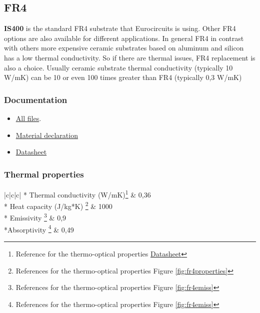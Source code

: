 \documentclass[final]{cubedoc}
\begin{document}
	\pagebreak
	
	\subsection{FR4}
	
	\textbf{IS400} is the standard FR4 substrate that Eurocircuits is using. Other FR4 options are also available for different applications. In general FR4 in contrast with others more expensive ceramic substrates based on aluminum and silicon has a low thermal conductivity. So if there are thermal issues, FR4 replacement is also a choice. Usually ceramic substrate thermal conductivity (typically 10 W/mK) can be 10 or even 100 times greater than FR4 (typically 0,3 W/mK) \cite{zotero-57, zotero-56}
	
	\subsubsection{Documentation}
	
	\begin{itemize}
		\item \href{https://www.isola-group.com/products/all-printed-circuit-materials/is400/}{All files}. 
		\item \href{https://www.isola-group.com/wp-content/uploads/IS400MaterialDeclaration2007.pdf}{Material declaration}
		\item \href{https://www.isola-group.com/wp-content/uploads/data-sheets/is400.pdf?v=1585950502}{Datasheet}
	\end{itemize}
	
	
	\subsubsection{Thermal properties}
	
	\begin{center}
		\tablehead{\hline}
		\tabletail{\hline}
		\begin{mpsupertabular}{|c|c|c|}
			 {*} {Thermal conductivity (W/mK)\footnote{Reference for the thermo-optical properties \href{https://www.isola-group.com/wp-content/uploads/data-sheets/is400.pdf?v=1585950502}{Datasheet}}} & 0,36 \\  
			\hline
			 {*} {Heat capacity (J/kg*K) \footnote{References for the thermo-optical properties Figure \ref{fig:fr4properties}}} & 1000 \\ 
			\hline
			 {*} {Emissivity  \footnote{References for the thermo-optical properties Figure \ref{fig:fr4emiss}}} & 0,9  \\
			\hline
			 {*}{Absorptivity  \footnote{References for the thermo-optical properties Figure \ref{fig:fr4emiss}}} & 0,49 \\
			\hline
		\end{mpsupertabular}
	\end{center}
	
\end{document}
